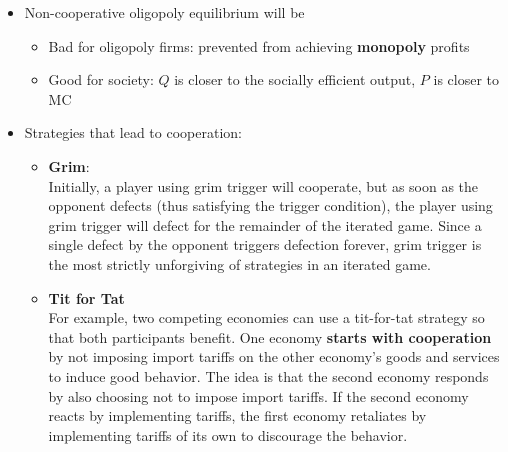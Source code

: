 \documentclass{article}
\begin{document}
\begin{multicols}{2}
\begin{itemize}
\begin{center}
\begin{table}[H]
{\begin{tabular}{cc|cc}
			\end{tabular}}
		\end{table}
	\end{center}
	\item Non-cooperative oligopoly equilibrium will be
	\begin{itemize}
		\item Bad for oligopoly firms: prevented from achieving \textbf{monopoly} profits
		\item Good for society: $Q$ is closer to the socially efficient output, $P$ is closer to MC
	\end{itemize}
    \item Strategies that lead to cooperation:
    \begin{itemize}
    	\item \textbf{Grim}:\\
    	Initially, a player using grim trigger will cooperate, but as soon as the opponent defects (thus satisfying the trigger condition), the player using grim trigger will defect for the remainder of the iterated game. Since a single defect by the opponent triggers defection forever, grim trigger is the most strictly unforgiving of strategies in an iterated game.
    	\item \textbf{Tit for Tat}\\
    	 For example, two competing economies can use a tit-for-tat strategy so that both participants benefit. One economy \textbf{starts with cooperation }by not imposing import tariffs on the other economy's goods and services to induce good behavior. The idea is that the second economy responds by also choosing not to impose import tariffs. If the second economy reacts by implementing tariffs, the first economy retaliates by implementing tariffs of its own to discourage the behavior.
    \end{itemize}
\end{itemize}
\end{multicols}
\end{document}
